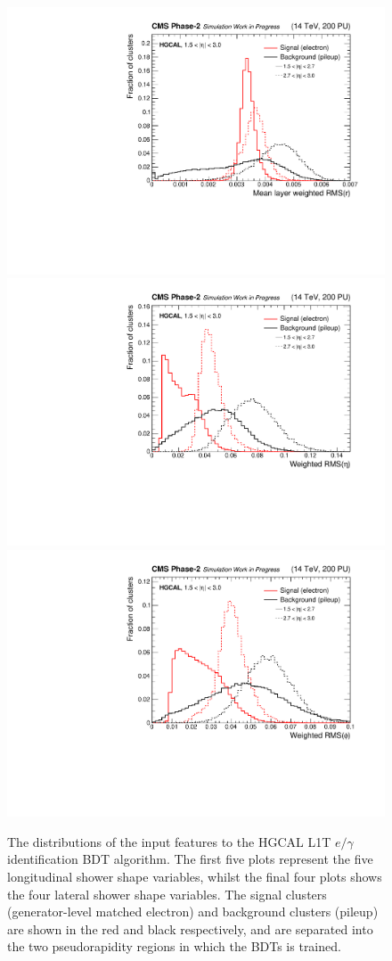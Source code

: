 \begin{figure}[htb!]
  \includegraphics[width=.32\textwidth]{Figures/cms/egid/cl3d_srrmean.pdf}
  \includegraphics[width=.32\textwidth]{Figures/cms/egid/cl3d_seetot.pdf}
  \includegraphics[width=.32\textwidth]{Figures/cms/egid/cl3d_spptot.pdf}
  \caption[$e/\gamma$ identification input feature distributions]
  {
    The distributions of the input features to the HGCAL L1T $e/\gamma$ identification BDT algorithm. The first five plots represent the five longitudinal shower shape variables, whilst the final four plots shows the four lateral shower shape variables. The signal clusters (generator-level matched electron) and background clusters (pileup) are shown in the red and black respectively, and are separated into the two pseudorapidity regions in which the BDTs is trained.
  }
  \label{fig:egid_all_features}
\end{figure}